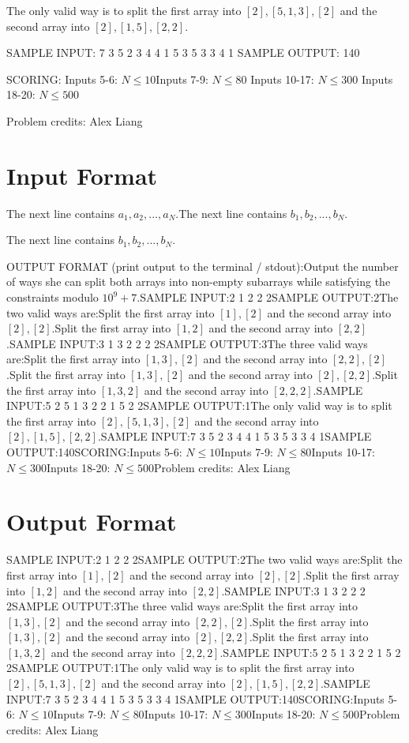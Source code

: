\documentclass[12pt]{article}
\begin{document}
The only valid way is to split the first array into $[2],[5,1,3],[2]$ and the 
second array into $[2],[1,5],[2,2]$.

SAMPLE INPUT:
7
3 5 2 3 4 4 1
5 3 5 3 3 4 1
SAMPLE OUTPUT: 
140

SCORING:
Inputs 5-6: $N \le 10$Inputs 7-9: $N \le 80$ Inputs
10-17: $N \le 300$ Inputs 18-20: $N \le 500$ 


Problem credits: Alex Liang



\section*{Input Format}
The next line contains $a_1,a_2,...,a_N$.The next line contains $b_1,b_2,...,b_N$.

The next line contains $b_1,b_2,...,b_N$.

OUTPUT FORMAT (print output to the terminal / stdout):Output the number of ways she can split both arrays into non-empty subarrays
while satisfying the constraints modulo $10^9+7$.SAMPLE INPUT:2
1 2
2 2SAMPLE OUTPUT:2The two valid ways are:Split the first array into $[1],[2]$ and the second array into
$[2],[2]$.Split the first array into $[1,2]$ and the second array into
$[2,2]$.SAMPLE INPUT:3
1 3 2
2 2 2SAMPLE OUTPUT:3The three valid ways are:Split the first array into $[1,3],[2]$ and the second array into
$[2,2],[2]$.Split the first array into $[1,3],[2]$ and the second
array into $[2],[2,2]$.Split the first array into $[1,3,2]$ and the
second array into $[2,2,2]$.SAMPLE INPUT:5
2 5 1 3 2
2 1 5 2 2SAMPLE OUTPUT:1The only valid way is to split the first array into $[2],[5,1,3],[2]$ and the 
second array into $[2],[1,5],[2,2]$.SAMPLE INPUT:7
3 5 2 3 4 4 1
5 3 5 3 3 4 1SAMPLE OUTPUT:140SCORING:Inputs 5-6: $N \le 10$Inputs 7-9: $N \le 80$Inputs
10-17: $N \le 300$Inputs 18-20: $N \le 500$Problem credits: Alex Liang

\section*{Output Format}
SAMPLE INPUT:2
1 2
2 2SAMPLE OUTPUT:2The two valid ways are:Split the first array into $[1],[2]$ and the second array into
$[2],[2]$.Split the first array into $[1,2]$ and the second array into
$[2,2]$.SAMPLE INPUT:3
1 3 2
2 2 2SAMPLE OUTPUT:3The three valid ways are:Split the first array into $[1,3],[2]$ and the second array into
$[2,2],[2]$.Split the first array into $[1,3],[2]$ and the second
array into $[2],[2,2]$.Split the first array into $[1,3,2]$ and the
second array into $[2,2,2]$.SAMPLE INPUT:5
2 5 1 3 2
2 1 5 2 2SAMPLE OUTPUT:1The only valid way is to split the first array into $[2],[5,1,3],[2]$ and the 
second array into $[2],[1,5],[2,2]$.SAMPLE INPUT:7
3 5 2 3 4 4 1
5 3 5 3 3 4 1SAMPLE OUTPUT:140SCORING:Inputs 5-6: $N \le 10$Inputs 7-9: $N \le 80$Inputs
10-17: $N \le 300$Inputs 18-20: $N \le 500$Problem credits: Alex Liang
\end{document}
